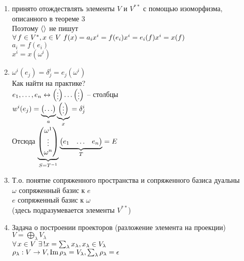 \documentclass[12pt]{article}
\begin{document}
\begin{enumerate}
    \item принято отождествлять элементы $V$ и $V^{**}$ с помощью изоморфизма, описанного в теореме 3\\
    Поэтому $\lan \ran$ не пишут\\
    $\fall f\in V^*, x\in V\ f(x)=a_ix^i = f(e_i)x^i = e_i(f)x^i = x(f)$\\
    $a_i = f(e_i)$\\
    $x^i = x(\omega^i)$
    \item $\omega^i(e_j) = \delta_j^i = e_j(\omega^i)$\\
    Как найти на практике?\\
    $e_1, \ldots, e_n \lrto \begin{pmatrix}\vdots\end{pmatrix}\ldots\begin{pmatrix}\vdots\end{pmatrix}$ -- столбцы\\
    $w^i(e_j)=\ub a{\begin{pmatrix}\ldots\end{pmatrix}}\ub x{\begin{pmatrix}\vdots\end{pmatrix}} = \delta_j^i$\\
    Отсюда $\ub{S=T^{-1}}{\begin{pmatrix}
        \omega^1\\\vdots\\\omega^n
    \end{pmatrix}}\ub{T}{\begin{pmatrix}e_1 & \ldots & e_n\end{pmatrix}} = E$
    \item Т.о. понятие сопряженного пространства и сопряженного базиса дуальны\\
    $\omega$ сопряженный базис к $e$\\
    $e$ сопряженный базис к $\omega$\\
    (здесь подразумевается элементы $V^{**}$)
    \item Задача о построении проекторов (разложение элемента на проекции)\\
    $V = \bigoplus_\lambda V_\lambda$\\
    $\fall x \in V\ \ex! x = \sum_\lambda x_\lambda, x_\lambda \in V_\lambda$\\
    $\rho_\lambda: V\rto V, \im \rho_\lambda = V_\lambda, \sum_\lambda \rho_\lambda = \epsilon$\\

\end{enumerate}
\end{document}
